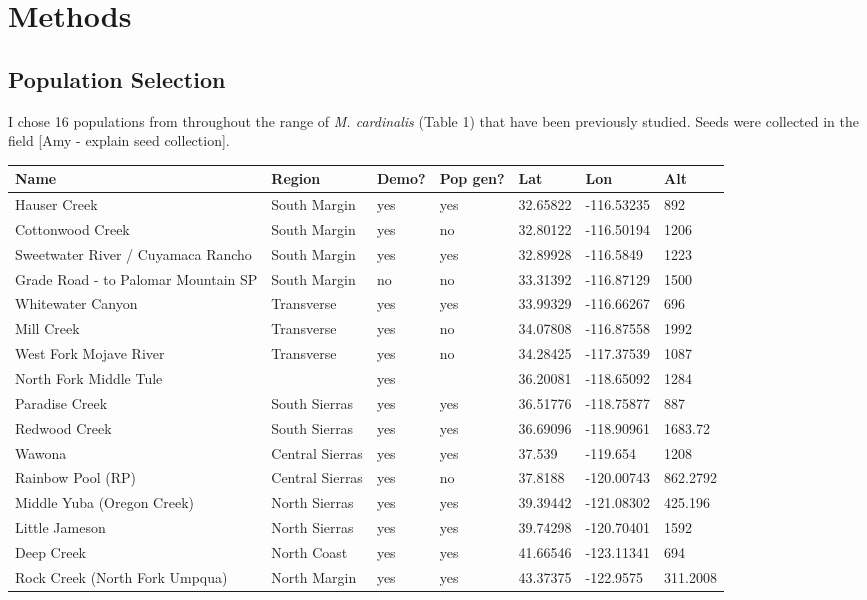 \documentclass[11pt, oneside]{article}
\begin{document}
\section*{Methods}

\subsection*{Population Selection}

I chose 16 populations from throughout the range of \textit{M. cardinalis} (Table 1) that have been previously studied. Seeds were collected in the field [Amy - explain seed collection].

\begin{table}[htbp]
   \centering
   \begin{tabular}{@{} lllllll @{}}
      \toprule
      Name    & Region & Demo? & Pop gen? & Lat & Lon & Alt \\
      \midrule
	Hauser Creek						& South Margin		& yes	& yes	& 32.65822	& -116.53235	& 892 \\
	Cottonwood Creek					& South Margin		& yes	& no		& 32.80122	& -116.50194	& 1206 \\
	Sweetwater River / Cuyamaca Rancho	& South Margin		& yes	& yes	& 32.89928	& -116.5849	& 1223 \\
	Grade Road - to Palomar Mountain SP	& South Margin		& no		& no		& 33.31392	& -116.87129	& 1500 \\
	Whitewater Canyon					& Transverse		& yes	& yes	& 33.99329	& -116.66267	& 696 \\
	Mill Creek							& Transverse		& yes	& no		& 34.07808	& -116.87558	& 1992 \\
	West Fork Mojave River				& Transverse		& yes	& no		& 34.28425	& -117.37539	& 1087 \\
	North Fork Middle Tule				&				& yes	&		& 36.20081	& -118.65092	& 1284 \\
	Paradise Creek						& South Sierras		& yes	& yes	& 36.51776	& -118.75877	& 887 \\
	Redwood Creek					& South Sierras		& yes	& yes	& 36.69096	& -118.90961	& 1683.72 \\
	Wawona							& Central Sierras	& yes	& yes	& 37.539		& -119.654	& 1208 \\
	Rainbow Pool (RP)					& Central Sierras	& yes	& no		& 37.8188		& -120.00743	& 862.2792 \\
	Middle Yuba (Oregon Creek)			& North Sierras		& yes	& yes	& 39.39442	& -121.08302	& 425.196 \\
	Little Jameson						& North Sierras		& yes	& yes	& 39.74298	& -120.70401	& 1592 \\
	Deep Creek						& North Coast		& yes	& yes	& 41.66546	& -123.11341	& 694 \\
	Rock Creek (North Fork Umpqua)		& North Margin		& yes	& yes	& 43.37375	& -122.9575	& 311.2008 \\
	\bottomrule
   \end{tabular}
\end{table}
\end{document}
